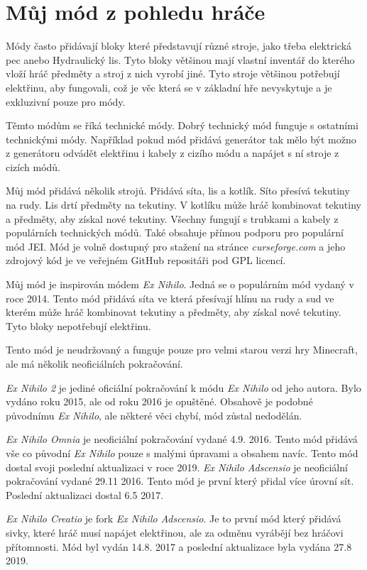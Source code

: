 \documentclass[FM,Proj,bw]{tulthesis}
\begin{document}
\chapter{Můj mód z pohledu hráče}
\par Módy často přidávají bloky které představují různé stroje, jako třeba elektrická pec anebo Hydraulický lis. Tyto bloky většinou mají vlastní inventář do kterého vloží hráč předměty a stroj z nich vyrobí jiné. Tyto stroje většinou potřebují elektřinu, aby fungovali, což je věc která se v základní hře nevyskytuje a je exkluzivní pouze pro módy.
 \par   Těmto módům se říká technické módy. Dobrý technický mód funguje s ostatními technickými módy. Například pokud mód přidává generátor tak mělo být možno z generátoru odvádět elektřinu i kabely z cizího módu a napájet s ní stroje z cizích módů. 
 \par   Můj mód přidává několik strojů. Přidává síta, lis a kotlík. Síto přesívá tekutiny na rudy. Lis drtí předměty na tekutiny. V kotlíku může hráč kombinovat tekutiny a předměty, aby získal nové tekutiny. Všechny fungují s trubkami a kabely z populárních technických módů. Také obsahuje přímou podporu pro populární mód JEI. Mód je volně dostupný pro stažení na stránce \textit{curseforge.com} a jeho zdrojový kód je ve veřejném GitHub repositáři pod GPL licencí.
\par Můj mód je inspirován módem\textit{ Ex Nihilo}. Jedná se o populárním mód vydaný v roce 2014. Tento mód přidává síta ve která přesívají hlínu na rudy a sud ve kterém může hráč kombinovat tekutiny a předměty, aby získal nové tekutiny. Tyto bloky nepotřebují elektřinu.
 \par Tento mód je neudržovaný a funguje pouze pro velmi starou verzi hry Minecraft, ale má několik neoficiálních pokračování. 
 \par \textit{Ex Nihilo 2} je jediné oficiální pokračování k módu \textit{ Ex Nihilo} od jeho autora. Bylo vydáno roku 2015, ale od roku 2016 je opuštěné. Obsahově je podobné původnímu \textit{Ex Nihilo}, ale některé věci chybí, mód zůstal nedodělán.
 \par \textit{Ex Nihilo Omnia} je neoficiální pokračování vydané 4.9. 2016. Tento mód přidává vše co původní \textit{ Ex Nihilo} pouze s malými úpravami a obsahem navíc. Tento mód dostal svoji poslední aktualizaci v roce 2019.
\textit{Ex Nihilo Adscensio} je neoficiální pokračování vydané 29.11 2016. Tento mód je první který přidal více úrovní sít. Poslední aktualizaci dostal 6.5 2017.
\par \textit{Ex Nihilo Creatio} je fork \textit{Ex Nihilo Adscensio}. Je to první mód který přidává sivky, které hráč musí napájet elektřinou, ale za odměnu vyrábějí bez hráčovi přítomnosti. Mód byl vydán 14.8. 2017 a poslední aktualizace byla vydána 27.8 2019.
\end{document}
